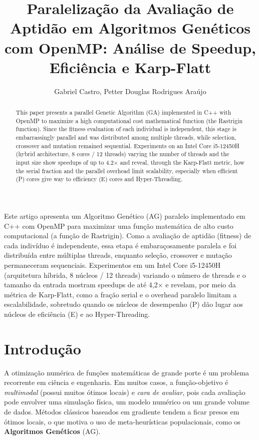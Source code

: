 \documentclass[12pt]{article}
\title{Paralelização da Avaliação de Aptidão em Algoritmos Genéticos
  com OpenMP: Análise de Speedup, Eficiência e Karp-Flatt}
\author{Gabriel Castro\inst{1}, Petter Douglas Rodrigues Araújo\inst{1}}
\begin{document}
\maketitle

\begin{abstract}
  This paper presents a parallel Genetic Algorithm (GA) implemented in C++
  with OpenMP to maximize a high computational cost mathematical function (the
  Rastrigin function). Since the fitness evaluation of each individual is
  independent, this stage is embarrassingly parallel and was distributed among
  multiple threads, while selection, crossover and mutation remained
  sequential. Experiments on an Intel Core i5-12450H (hybrid architecture, 8
  cores / 12 threads) varying the number of threads and the input size show
  speedups of up to 4.2$\times$ and reveal, through the Karp-Flatt metric, how the
  serial fraction and the parallel overhead limit scalability, especially when
  efficient (P) cores give way to efficiency (E) cores and Hyper-Threading.
\end{abstract}

\begin{resumo}
  Este artigo apresenta um Algoritmo Genético (AG) paralelo implementado em
  C++ com OpenMP para maximizar uma função matemática de alto custo
  computacional (a função de Rastrigin). Como a avaliação de aptidão (fitness)
  de cada indivíduo é independente, essa etapa é embaraçosamente paralela e foi
  distribuída entre múltiplas threads, enquanto seleção, crossover e mutação
  permaneceram sequenciais. Experimentos em um Intel Core i5-12450H
  (arquitetura híbrida, 8 núcleos / 12 threads) variando o número de threads e o
  tamanho da entrada mostram speedups de até 4,2$\times$ e revelam, por meio da métrica
  de Karp-Flatt, como a fração serial e o overhead paralelo limitam a
  escalabilidade, sobretudo quando os núcleos de desempenho (P) dão lugar aos
  núcleos de eficiência (E) e ao Hyper-Threading.
\end{resumo}

\section{Introdução}

A otimização numérica de funções matemáticas de grande porte é um problema
recorrente em ciência e engenharia. Em muitos casos, a função-objetivo é
\emph{multimodal} (possui muitos ótimos locais) e \emph{cara de avaliar},
pois cada avaliação pode envolver uma simulação física, um modelo numérico ou
um grande volume de dados. Métodos clássicos baseados em gradiente tendem a
ficar presos em ótimos locais, o que motiva o uso de meta-heurísticas
populacionais, como os \textbf{Algoritmos Genéticos} (AG).
\end{document}

